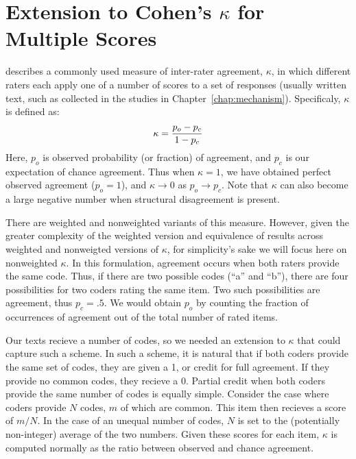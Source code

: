 \graphicspath{{appendices/kappa-extension/}}

\chapter{Extension to Cohen's \texorpdfstring{$\kappa$}{Kappa} for Multiple Scores}
\label{app:kappa}

\textcite{cohen_coefficient_1960} describes a commonly used measure of
inter-rater agreement, $\kappa$, in which different raters each
apply one of a number of scores to a set of responses (usually written text,
such as collected in the studies in Chapter~\ref{chap:mechanism}). Specificaly,
$\kappa$ is defined as: \[ \kappa = {p_o - p_c \over 1 - p_c} \] Here, $p_o$ is
observed probability (or fraction) of agreement, and $p_c$ is our expectation of
chance agreement. Thus when
$\kappa=1$, we have obtained perfect observed agreement ($p_o = 1$), and
$\kappa \to 0$ as $p_o \to p_c$. Note that $\kappa$ can also become a large
negative number when structural disagreement is present. 

There are weighted and nonweighted variants of this measure. However, given the
greater complexity of the weighted version and equivalence of results across
weighted and nonweigted versions of $\kappa$, for simplicity's sake we will
focus here on nonweighted $\kappa$. In this formulation, agreement occurs when
both raters provide the same code. Thus, if there are two possible codes (“a”
and “b”), there are four possibilities for two coders rating the same item.  Two
such possibilities are agreement, thus $p_c = .5$. We would obtain $p_o$ by
counting the fraction of occurrences of agreement out of the total number of
rated items.

Our texts recieve a number of codes, so we needed an extension to $\kappa$ that
could capture such a scheme. In such a scheme, it is natural that if both coders
provide the same set of codes, they are given a 1, or credit for full agreement.
If they provide no common codes, they recieve a 0. Partial credit when both
coders provide the same number of codes is equally simple. Consider the case
where coders provide $\mathit{N}$ codes, $m$ of which are common. This item then
recieves a score of $m/\mathit{N}$. In the case of an unequal number of codes,
$\mathit{N}$ is set to the (potentially non-integer) average of the two numbers.
Given these scores for each item, $\kappa$ is computed normally as the ratio
between observed and chance agreement. 

